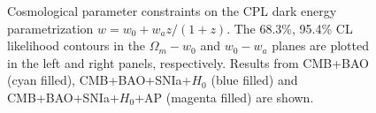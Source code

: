 \documentclass[iop]{emulateapj}
\begin{document}
\begin{figure}
   \caption{\label{fig_con}
   Cosmological parameter constraints on the CPL dark energy parametrization $w=w_0+w_a {z}/{(1+z)}$.
   The 68.3\%, 95.4\% CL likelihood contours in the $\Omega_m - w_0$  and $w_0 - w_a$ planes are plotted in the left and right panels, respectively.
   Results from CMB+BAO (cyan filled), CMB+BAO+SNIa+$H_0$ (blue filled)
   and CMB+BAO+SNIa+$H_0$+AP (magenta filled) are shown.
}
\end{figure}
\end{document}
